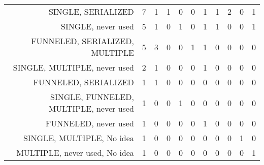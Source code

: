 {\begin{landscape}
\begin{longtable}[htb]{r|c|c|c|c|c|c|c|c|c|c}
{SINGLE, SERIALIZED} & 7 & 1 & 1 & 0 & 0 & 1 & 1 & 2 & 0 & 1 \\%
{SINGLE, never used} & 5 & 1 & 0 & 1 & 0 & 1 & 1 & 0 & 0 & 1 \\%
{FUNNELED, SERIALIZED, MULTIPLE} & 5 & 3 & 0 & 0 & 1 & 1 & 0 & 0 & 0 & 0 \\%
{SINGLE, MULTIPLE, never used} & 2 & 1 & 0 & 0 & 0 & 1 & 0 & 0 & 0 & 0 \\%
{FUNNELED, SERIALIZED} & 1 & 1 & 0 & 0 & 0 & 0 & 0 & 0 & 0 & 0 \\%
{SINGLE, FUNNELED, MULTIPLE, never used} & 1 & 0 & 0 & 1 & 0 & 0 & 0 & 0 & 0 & 0 \\%
{FUNNELED, never used} & 1 & 0 & 0 & 0 & 0 & 1 & 0 & 0 & 0 & 0 \\%
{SINGLE, MULTIPLE, No idea} & 1 & 0 & 0 & 0 & 0 & 0 & 0 & 0 & 1 & 0 \\%
{MULTIPLE, never used, No idea} & 1 & 0 & 0 & 0 & 0 & 0 & 0 & 0 & 0 & 1 \\%
\hline%
\end{longtable}%
\end{landscape}}%
\clearpage%

